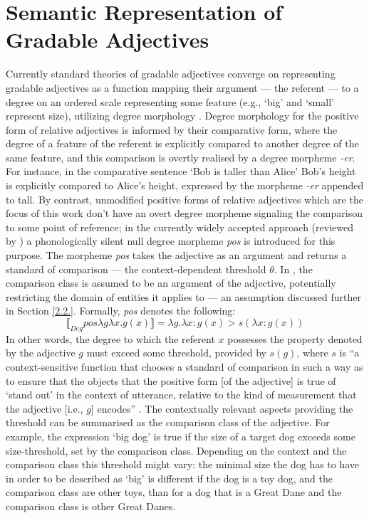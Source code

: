 \section{Semantic Representation of Gradable Adjectives}
\label{2.1.}
Currently standard theories of gradable adjectives converge on representing gradable adjectives as a function mapping their argument --- the referent --- to a degree on an ordered scale representing some feature (e.g., ‘big’ and ‘small’ represent size),  utilizing degree morphology \parencite{Kennedy2007}. Degree morphology for the positive form of relative adjectives is informed by their comparative form, where the degree of a feature of the referent is explicitly compared to another degree of the same feature, and this comparison is overtly realised by a degree morpheme \textit{-er}. For instance, in the comparative sentence ‘Bob is taller than Alice’ Bob’s height is explicitly compared to Alice’s height, expressed by the morpheme \textit{-er} appended to tall. 
By contrast, unmodified positive forms of relative adjectives which are the focus of this work don’t have an overt degree morpheme signaling the comparison to some point of reference; in the currently widely accepted approach (reviewed by \cite{Kennedy2007}) a phonologically silent null degree morpheme \textit{pos} is introduced for this purpose. 
The morpheme \textit{pos} takes the adjective as an argument and returns a standard of comparison --- the context-dependent threshold $\theta$. In \textcite{Kennedy2007}, the comparison class is assumed to be an argument of the adjective, potentially restricting the domain of entities it applies to --- an assumption discussed further in Section \ref{2.2.}. Formally, \textit{pos} denotes the following:
\begin{equation}
\llbracket_{Deg} pos \lambda g \lambda x. g(x)  \rrbracket = \lambda g. \lambda x: g(x) > s(\lambda x: g(x))
\end{equation}
In other words, the degree to which the referent $x$ possesses the property denoted by the adjective $g$ must exceed some threshold, provided by $s(g)$, where $s$ is “a context-sensitive function that chooses a standard of comparison in such a way as to ensure that the objects that the positive form [of the adjective] is true of ‘stand out’ in the context of utterance, relative to the kind of measurement that the adjective [i.e., $g$] encodes” \parencite[p. 17]{Kennedy2007}. The contextually relevant aspects providing the threshold can be summarised as the comparison class of the adjective. 
For example, the expression ‘big dog’ is true if the size of a target dog exceeds some size-threshold, set by the comparison class. Depending on the context and the comparison class this threshold might vary: the minimal size the dog has to have in order to be described as ‘big’ is different if the dog is a toy dog, and the comparison class are other toys, than for a dog that is a Great Dane and the comparison class is other Great Danes.

